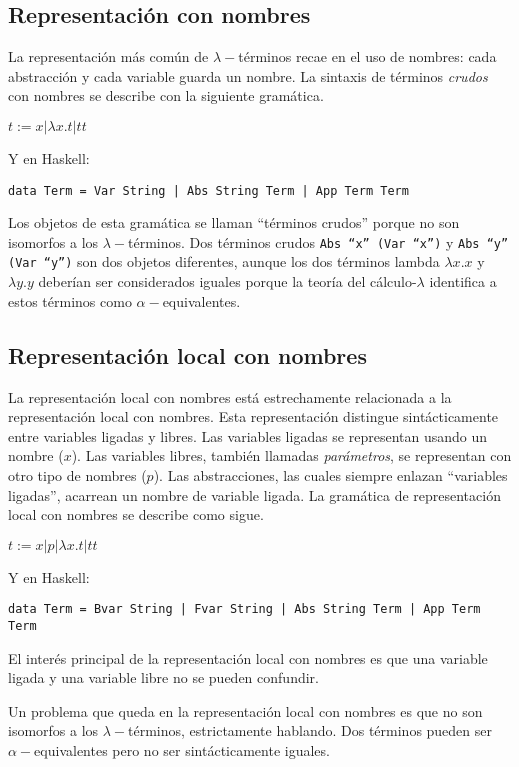 \documentclass{article}
\begin{document}
\subsection{Representación con nombres}

La representación más común de $\lambda-$términos recae en el uso de nombres: cada abstracción y cada variable guarda un nombre. La sintaxis de términos \textit{crudos} con nombres se describe con la siguiente gramática.

$t := x | \lambda x.t | t t$

Y en Haskell:

\texttt{data Term = Var String |  Abs String Term | App Term Term}

Los objetos de esta gramática se llaman ``términos crudos'' porque no son isomorfos a los $\lambda-$términos. Dos términos crudos \texttt{Abs ``x'' (Var ``x'')} y \texttt{Abs ``y'' (Var ``y'')} son dos objetos diferentes, aunque los dos términos lambda $\lambda x.x$ y $\lambda y.y$ deberían ser considerados iguales porque la teoría del cálculo-$\lambda$ identifica a estos términos como $\alpha-$equivalentes.

\subsection{Representación local con nombres}

La representación local con nombres está estrechamente relacionada a la representación local con nombres. Esta representación distingue sintácticamente entre variables ligadas y libres. Las variables ligadas se representan usando un nombre ($x$). Las variables libres, también llamadas \textit{parámetros}, se representan con otro tipo de nombres ($p$). Las abstracciones, las cuales siempre enlazan ``variables ligadas'', acarrean un nombre de variable ligada. La gramática de representación local con nombres se describe como sigue.

$t := x | p | \lambda x.t | t t$

Y en Haskell:

\texttt{data Term = Bvar String | Fvar String | Abs String Term | App Term Term}

El interés principal de la representación local con nombres es que una variable ligada y una variable libre no se pueden confundir.

Un problema que queda en la representación local con nombres es que no son isomorfos a los $\lambda-$términos, estrictamente hablando. Dos términos pueden ser $\alpha-$equivalentes pero no ser sintácticamente iguales.
\end{document}
